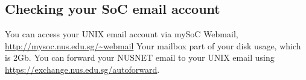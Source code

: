 \subsection{Checking your SoC email account}
\begin{frame}
You can access your UNIX email account via mySoC Webmail, \url{http://mysoc.nus.edu.sg/~webmail}
Your mailbox part of your disk usage, which is 2Gb. You can forward your NUSNET
email to your UNIX email using \url{https://exchange.nus.edu.sg/autoforward}.
\end{frame}

